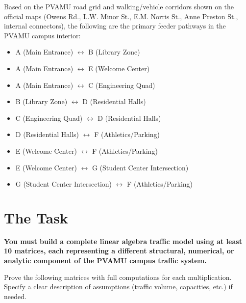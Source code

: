 \documentclass{ximera}
\begin{document}
Based on the PVAMU road grid and walking/vehicle corridors shown on the official maps (Owens Rd., L.W. Minor St., E.M. Norris St., Anne Preston St., internal connectors), the following are the primary feeder pathways in the PVAMU campus interior:

\begin{itemize}
    \item A (Main Entrance) $\leftrightarrow$ B (Library Zone)
    \item A (Main Entrance) $\leftrightarrow$ E (Welcome Center)
    \item A (Main Entrance) $\leftrightarrow$ C (Engineering Quad)
    \item B (Library Zone) $\leftrightarrow$ D (Residential Halls)
    \item C (Engineering Quad) $\leftrightarrow$ D (Residential Halls)
    \item D (Residential Halls) $\leftrightarrow$ F (Athletics/Parking)
    \item E (Welcome Center) $\leftrightarrow$ F (Athletics/Parking)
    \item E (Welcome Center) $\leftrightarrow$ G (Student Center Intersection)
    \item G (Student Center Intersection) $\leftrightarrow$ F (Athletics/Parking)
\end{itemize}



\section*{The Task}

\textbf{You must build a complete linear algebra traffic model using at least 10 matrices, each representing a different structural, numerical, or analytic component of the PVAMU campus traffic system.}

Prove the following matrices with full computations for each multiplication. Specify a clear description of assumptions (traffic volume, capacities, etc.) if needed.\\
\end{document}
